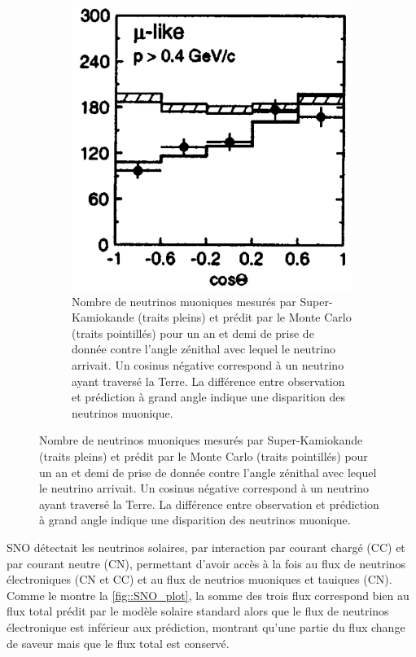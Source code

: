 \begin{figure}[htbp]
\begin{subfigure}[t]{0.4\textwidth}
                    \includegraphics[width=\textwidth]{Chapitre_1/pictures/superK_plot.png}
                    \caption{Nombre de neutrinos muoniques mesurés par Super-Kamiokande (traits pleins) et prédit par le Monte Carlo (traits pointillés) pour un an et demi de prise de donnée contre l'angle zénithal avec lequel le neutrino arrivait\cite{Fukuda1998}. Un cosinus négative correspond à un neutrino ayant traversé la Terre. La différence entre observation et prédiction à grand angle indique une disparition des neutrinos muonique.}
                    \label{fig::superK_plot}
                \end{subfigure}
            \end{figure}
            
            SNO détectait les neutrinos solaires, par interaction par courant chargé (CC) et par courant neutre (CN), permettant d'avoir accès à la fois au flux de neutrinos électroniques (CN et CC) et au flux de neutrios muoniques et tauiques (CN). Comme le montre la \autoref{fig::SNO_plot}, la somme des trois flux correspond bien au flux total prédit par le modèle solaire standard alors que le flux de neutrinos électronique est inférieur aux prédiction, montrant qu'une partie du flux change de saveur mais que le flux total est conservé.
            
